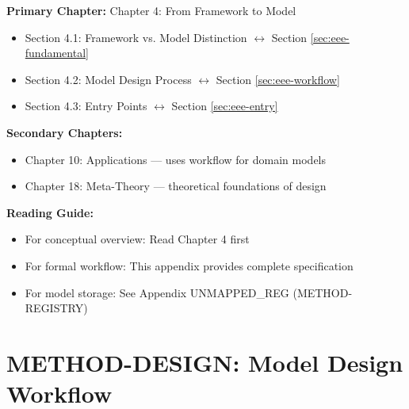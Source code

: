 \begin{tcolorbox}[colback=purple!5!white, colframe=purple!75!black,
    title=Chapter Linkage]

\textbf{Primary Chapter:} Chapter 4: From Framework to Model
\begin{itemize}[nosep]
\item Section 4.1: Framework vs. Model Distinction $\leftrightarrow$ Section \ref{sec:eee-fundamental}
\item Section 4.2: Model Design Process $\leftrightarrow$ Section \ref{sec:eee-workflow}
\item Section 4.3: Entry Points $\leftrightarrow$ Section \ref{sec:eee-entry}
\end{itemize}

\textbf{Secondary Chapters:}
\begin{itemize}[nosep]
\item Chapter 10: Applications --- uses workflow for domain models
\item Chapter 18: Meta-Theory --- theoretical foundations of design
\end{itemize}

\textbf{Reading Guide:}
\begin{itemize}[nosep]
\item For conceptual overview: Read Chapter 4 first
\item For formal workflow: This appendix provides complete specification
\item For model storage: See Appendix UNMAPPED_REG (METHOD-REGISTRY)
\end{itemize}

\end{tcolorbox}

\chapter{METHOD-DESIGN: Model Design Workflow}
\label{app:method-design}

\begin{abstract}
This appendix defines the systematic workflow for designing testable behavioral
models from the Evidence-Based Framework (EBF). The workflow supports two entry
points---theory-driven and practice-driven (Gestaltungsanlass)---which converge
through iterative Scope-Context specification. Central to the workflow is the
3+1 Choice Architecture (Axiom MD-1), which provides three curated options plus
one self-defined option at each decision point. Options are drawn from the Model
Registry (Appendix UNMAPPED_REG) via similarity search (Axiom MD-2).
\end{abstract}

